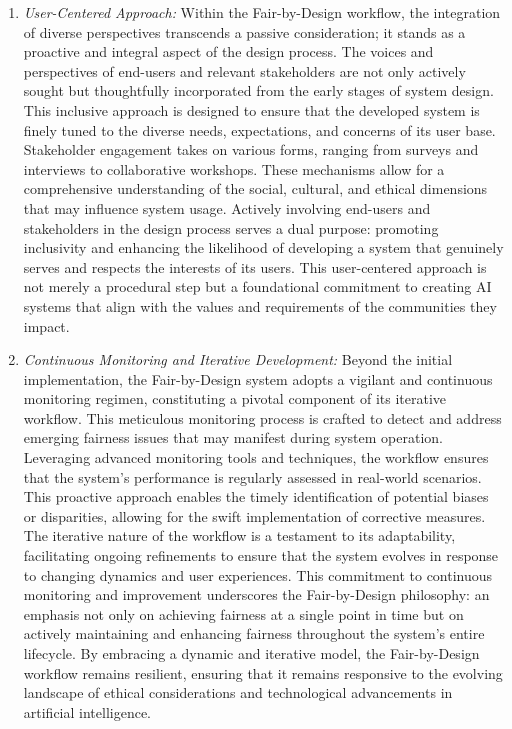 \documentclass[12pt,a4paper,openright,twoside]{book}
\begin{document}
\begin{enumerate}
    \item \emph{User-Centered Approach:} Within the Fair-by-Design workflow, the integration of diverse perspectives transcends a passive consideration; it stands as a proactive and integral aspect of the design process. The voices and perspectives of end-users and relevant stakeholders are not only actively sought but thoughtfully incorporated from the early stages of system design. This inclusive approach is designed to ensure that the developed system is finely tuned to the diverse needs, expectations, and concerns of its user base. Stakeholder engagement takes on various forms, ranging from surveys and interviews to collaborative workshops. These mechanisms allow for a comprehensive understanding of the social, cultural, and ethical dimensions that may influence system usage. Actively involving end-users and stakeholders in the design process serves a dual purpose: promoting inclusivity and enhancing the likelihood of developing a system that genuinely serves and respects the interests of its users. This user-centered approach is not merely a procedural step but a foundational commitment to creating AI systems that align with the values and requirements of the communities they impact.

    \item \emph{Continuous Monitoring and Iterative Development:} Beyond the initial implementation, the Fair-by-Design system adopts a vigilant and continuous monitoring regimen, constituting a pivotal component of its iterative workflow. This meticulous monitoring process is crafted to detect and address emerging fairness issues that may manifest during system operation. Leveraging advanced monitoring tools and techniques, the workflow ensures that the system's performance is regularly assessed in real-world scenarios. This proactive approach enables the timely identification of potential biases or disparities, allowing for the swift implementation of corrective measures. The iterative nature of the workflow is a testament to its adaptability, facilitating ongoing refinements to ensure that the system evolves in response to changing dynamics and user experiences. This commitment to continuous monitoring and improvement underscores the Fair-by-Design philosophy: an emphasis not only on achieving fairness at a single point in time but on actively maintaining and enhancing fairness throughout the system's entire lifecycle. By embracing a dynamic and iterative model, the Fair-by-Design workflow remains resilient, ensuring that it remains responsive to the evolving landscape of ethical considerations and technological advancements in artificial intelligence.

\end{enumerate}
\end{document}
